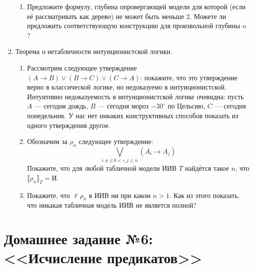 \documentclass[10pt,a4paper,oneside]{article}
\begin{document}
\begin{enumerate}
\begin{enumerate}
\item Предложите формулу, глубина опровергающей модели для которой (если её рассматривать как 
дерево) не может быть меньше 2. Можете ли предложить соответствующую конструкцию для произвольной 
глубины $n$?
\end{enumerate}

\item Теорема о нетабличности интуиционистской логики.
\begin{enumerate}
\item Рассмотрим следующее утверждение $(A \to B)\vee(B\to C)\vee(C \to A)$: 
покажите, что это утверждение верно в классической логике, но недоказуемо в интуиционистской. 
Интуитивно недоказуемость в интуиционистской логике очевидна: пусть $A$ --- сегодня дождь, 
$B$ --- сегодня мороз $-30^\circ$ по Цельсию,  $C$ --- сегодня понедельник. 
У нас нет никаких конструктивных способов показать из одного утверждения другое.

\item Обозначим за $\rho_n$ следующее утверждение:
$$\bigvee_{i \ne j; 0 < i,j \le n} (A_i \to A_j)$$ 
Покажите, что для любой табличной модели ИИВ $T$ найдётся такое $n$,
что $\llbracket \rho_n \rrbracket_T = \texttt{И}$.

\item Покажите, что $\nvdash \rho_n$ в ИИВ ни при каком $n > 1$. Как из этого показать, 
что никакая табличная модель ИИВ не является полной?
\end{enumerate}

\end{enumerate}

\section*{Домашнее задание №6: <<Исчисление предикатов>>}
\end{document}
